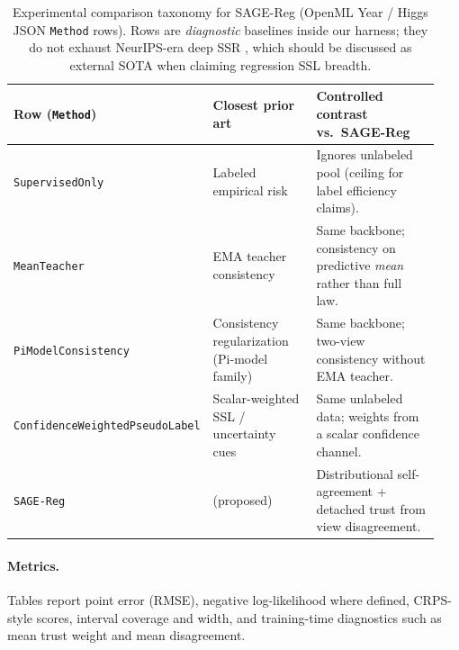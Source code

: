 \documentclass{article}
\begin{document}
\begin{table}[t]
  \caption{Experimental comparison taxonomy for SAGE-Reg (OpenML Year / Higgs
  JSON \texttt{Method} rows). Rows are \emph{diagnostic} baselines inside our
  harness; they do not exhaust NeurIPS-era deep SSR
  \protect\citep{dai2023semisupervised,huang2024rankup,sun2025heteroscedastic}, which should
  be discussed as external SOTA when claiming regression SSL breadth.}
  \label{tab:sage_baseline_map}
  \centering
  \small
  \begin{tabular}{@{}p{0.22\linewidth}p{0.30\linewidth}p{0.42\linewidth}@{}}
    \toprule
    Row (\texttt{Method}) & Closest prior art & Controlled contrast vs.\ SAGE-Reg \\
    \midrule
    \texttt{SupervisedOnly} & Labeled empirical risk & Ignores unlabeled pool (ceiling for label efficiency claims). \\
    \texttt{MeanTeacher} & EMA teacher consistency~\citep{tarvainen2017mean} & Same backbone; consistency on predictive \emph{mean} rather than full law. \\
    \texttt{PiModelConsistency} & Consistency regularization (Pi-model family) & Same backbone; two-view consistency without EMA teacher. \\
    \texttt{ConfidenceWeightedPseudoLabel} & Scalar-weighted SSL / uncertainty cues~\citep{chapelle2006semisupervised,kendall2017multi} & Same unlabeled data; weights from a scalar confidence channel. \\
    \texttt{SAGE-Reg} & (proposed) & Distributional self-agreement + detached trust from view disagreement. \\
    \bottomrule
  \end{tabular}
\end{table}

\paragraph{Metrics.}
Tables report point error (RMSE), negative log-likelihood where defined,
CRPS-style scores, interval coverage and width, and training-time diagnostics
such as mean trust weight and mean disagreement.
\end{document}
